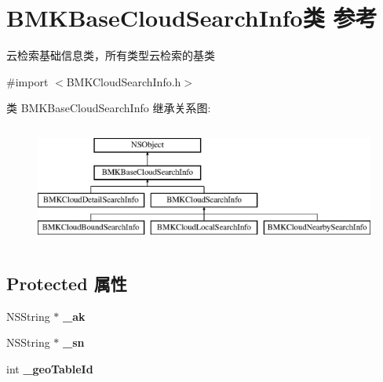 \hypertarget{interface_b_m_k_base_cloud_search_info}{\section{B\+M\+K\+Base\+Cloud\+Search\+Info类 参考}
\label{interface_b_m_k_base_cloud_search_info}
}


云检索基础信息类，所有类型云检索的基类  




{\ttfamily \#import $<$B\+M\+K\+Cloud\+Search\+Info.\+h$>$}

类 B\+M\+K\+Base\+Cloud\+Search\+Info 继承关系图\+:\begin{figure}[H]
\begin{center}
\leavevmode
\includegraphics[height=4.000000cm]{interface_b_m_k_base_cloud_search_info}
\end{center}
\end{figure}
\subsection*{Protected 属性}
\begin{DoxyCompactItemize}
\item 
\hypertarget{interface_b_m_k_base_cloud_search_info_a7e0ee4faf41da0365d2f427b677f621a}{N\+S\+String $\ast$ {\bfseries \+\_\+ak}}\label{interface_b_m_k_base_cloud_search_info_a7e0ee4faf41da0365d2f427b677f621a}

\item 
\hypertarget{interface_b_m_k_base_cloud_search_info_a2c8bc1521f7025190278e3f29647c652}{N\+S\+String $\ast$ {\bfseries \+\_\+sn}}\label{interface_b_m_k_base_cloud_search_info_a2c8bc1521f7025190278e3f29647c652}

\item 
\hypertarget{interface_b_m_k_base_cloud_search_info_a3d23b81d16c3054a5b73c2f017b435c3}{int {\bfseries \+\_\+geo\+Table\+Id}}\label{interface_b_m_k_base_cloud_search_info_a3d23b81d16c3054a5b73c2f017b435c3}

\end{DoxyCompactItemize}
